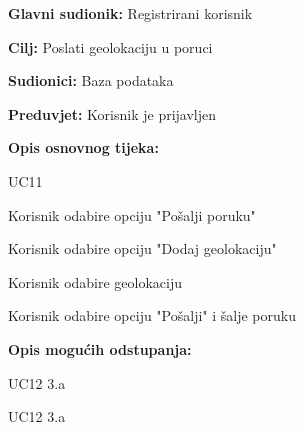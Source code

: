 \noindent {}
\begin{packed_item}
	
	\item \textbf{Glavni sudionik: }Registrirani korisnik
	\item  \textbf{Cilj:} Poslati geolokaciju u poruci
	\item  \textbf{Sudionici:} Baza podataka
	\item  \textbf{Preduvjet:} Korisnik je prijavljen
	\item  \textbf{Opis osnovnog tijeka:}
	
	\item[] \begin{packed_enum}
		
		\item UC11
		\item Korisnik odabire opciju "Pošalji poruku"
		\item Korisnik odabire opciju "Dodaj geolokaciju"
		\item Korisnik odabire geolokaciju
		\item Korisnik odabire opciju "Pošalji" i šalje poruku
		
	\end{packed_enum}
	
	\item  \textbf{Opis mogućih odstupanja:}
	
	\item[] \begin{packed_item}
		
		\item[4.a] UC12 3.a
		\item[5.a] UC12 3.a
		
		
	\end{packed_item}
\end{packed_item}

